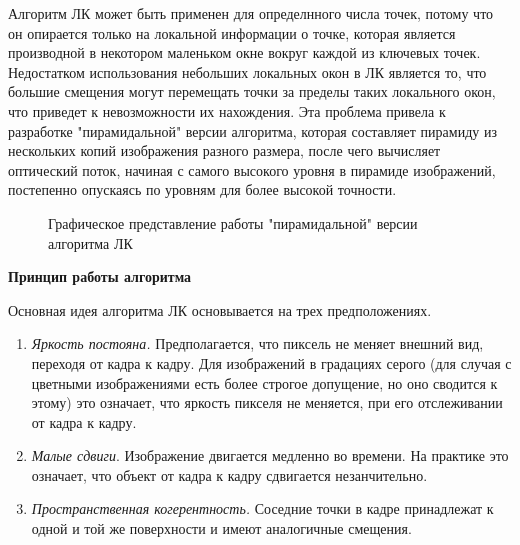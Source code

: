Алгоритм ЛК может быть применен для определнного числа точек, потому что он опирается только на локальной информации о точке, которая является производной в некотором маленьком окне вокруг каждой из ключевых точек. Недостатком использования небольших локальных окон в ЛК является то, что большие смещения могут перемещать точки за пределы таких локального окон, что приведет к невозможности их нахождения. Эта проблема привела к разработке "пирамидальной" версии алгоритма, которая составляет пирамиду из нескольких копий изображения разного размера, после чего вычисляет оптический поток, начиная с самого высокого уровня в пирамиде изображений, постепенно опускаясь по уровням для более высокой точности. 

\begin{figure}[!htb]
\caption{Графическое представление работы "пирамидальной" версии алгоритма ЛК}
\label{pic:pyrLK}
\end{figure}

\textbf{Принцип работы алгоритма}

Основная идея алгоритма ЛК основывается на трех предположениях. 
\begin{enumerate}
\item \textit{Яркость постояна.} Предполагается, что пиксель не меняет внешний вид, переходя от кадра к кадру. Для изображений в градациях серого (для случая с цветными изображениями есть более строгое допущение, но оно сводится к этому) это означает, что яркость пикселя не меняется, при его отслеживании от кадра к кадру. 
\item \textit{Малые сдвиги}. Изображение двигается медленно во времени. На практике это означает, что объект от кадра к кадру сдвигается незанчительно.
\item \textit{Пространственная когерентность.} Соседние точки в кадре принадлежат к одной и той же поверхности и имеют аналогичные смещения.
\end{enumerate}

